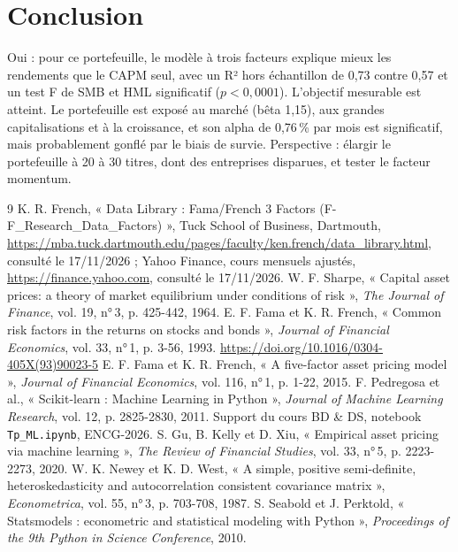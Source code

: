 \documentclass[11pt,a4paper]{article}
\newcommand{\pc}{\,\%}
\begin{document}
\section{Conclusion}

Oui : pour ce portefeuille, le modèle à trois facteurs explique mieux les rendements que le CAPM seul, avec un R² hors échantillon de 0,73 contre 0,57 et un test F de SMB et HML significatif ($p<0{,}0001$). L'objectif mesurable est atteint. Le portefeuille est exposé au marché (bêta 1,15), aux grandes capitalisations et à la croissance, et son alpha de 0,76\pc{} par mois est significatif, mais probablement gonflé par le biais de survie. Perspective : élargir le portefeuille à 20 à 30 titres, dont des entreprises disparues, et tester le facteur momentum.

\begin{thebibliography}{9}
 K. R. French, « Data Library : Fama/French 3 Factors (F-F\_Research\_Data\_Factors) », Tuck School of Business, Dartmouth, \url{https://mba.tuck.dartmouth.edu/pages/faculty/ken.french/data_library.html}, consulté le 17/11/2026 ; Yahoo Finance, cours mensuels ajustés, \url{https://finance.yahoo.com}, consulté le 17/11/2026.
 W. F. Sharpe, « Capital asset prices: a theory of market equilibrium under conditions of risk », \textit{The Journal of Finance}, vol. 19, n°\,3, p. 425-442, 1964.
 E. F. Fama et K. R. French, « Common risk factors in the returns on stocks and bonds », \textit{Journal of Financial Economics}, vol. 33, n°\,1, p. 3-56, 1993. \url{https://doi.org/10.1016/0304-405X(93)90023-5}
 E. F. Fama et K. R. French, « A five-factor asset pricing model », \textit{Journal of Financial Economics}, vol. 116, n°\,1, p. 1-22, 2015.
 F. Pedregosa et al., « Scikit-learn : Machine Learning in Python », \textit{Journal of Machine Learning Research}, vol. 12, p. 2825-2830, 2011.
 Support du cours BD \& DS, notebook \texttt{Tp\_ML.ipynb}, ENCG-2026.
 S. Gu, B. Kelly et D. Xiu, « Empirical asset pricing via machine learning », \textit{The Review of Financial Studies}, vol. 33, n°\,5, p. 2223-2273, 2020.
 W. K. Newey et K. D. West, « A simple, positive semi-definite, heteroskedasticity and autocorrelation consistent covariance matrix », \textit{Econometrica}, vol. 55, n°\,3, p. 703-708, 1987.
 S. Seabold et J. Perktold, « Statsmodels : econometric and statistical modeling with Python », \textit{Proceedings of the 9th Python in Science Conference}, 2010.
\end{thebibliography}
\end{document}
